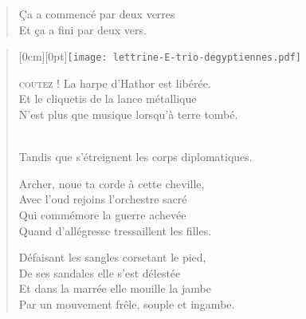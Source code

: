 \begin{verse}%
  \distique%
  Ça a commencé par deux verres\\  %
  Et ça a fini par deux vers.
\end{verse}

\begin{verse}%
  \quatrain%
  \begin{minipage}{\linewidth}
    \raisebox{-\height+0.7cm}[0cm][0pt]{\hspace{-1.1cm}\texttt{[image: lettrine-E-trio-degyptiennes.pdf]}}%
    \textsc{coutez !}  La harpe d’Hathor est libérée.\\\nopagebreak[4]
    \hspace{0.6cm}Et le cliquetis de la lance métallique\\\nopagebreak[4]
    \hspace{0.6cm}N’est plus que musique lorsqu’à terre tombé.
  \end{minipage}\\\vspace*{0.4ex}
  Tandis que s’étreignent les corps diplomatiques.

  Archer, noue ta corde à cette cheville,\\  %
  Avec l’oud rejoins l’orchestre sacré\\  %
  Qui commémore la guerre achevée\\  %
  Quand d’allégresse tressaillent les filles.

  Défaisant les sangles corsetant le pied,\\  %
  De ses sandales elle s’est délestée\\  %
  Et dans la marrée elle mouille la jambe\\  %
  Par un mouvement frêle, souple et ingambe.


\end{verse}
